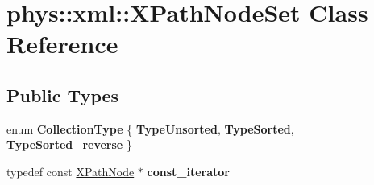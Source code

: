 \hypertarget{classphys_1_1xml_1_1XPathNodeSet}{
\section{phys::xml::XPathNodeSet Class Reference}
\label{de/dc2/classphys_1_1xml_1_1XPathNodeSet}
}
\subsection*{Public Types}
\begin{DoxyCompactItemize}
\item 
enum {\bfseries CollectionType} \{ {\bfseries TypeUnsorted}, 
{\bfseries TypeSorted}, 
{\bfseries TypeSorted\_\-reverse}
 \}
\item 
\hypertarget{classphys_1_1xml_1_1XPathNodeSet_ab893a3c9d60393ae5b3740196a5a6691}{
typedef const \hyperlink{classphys_1_1xml_1_1XPathNode}{XPathNode} $\ast$ {\bfseries const\_\-iterator}}
\label{de/dc2/classphys_1_1xml_1_1XPathNodeSet_ab893a3c9d60393ae5b3740196a5a6691}

\end{DoxyCompactItemize}
